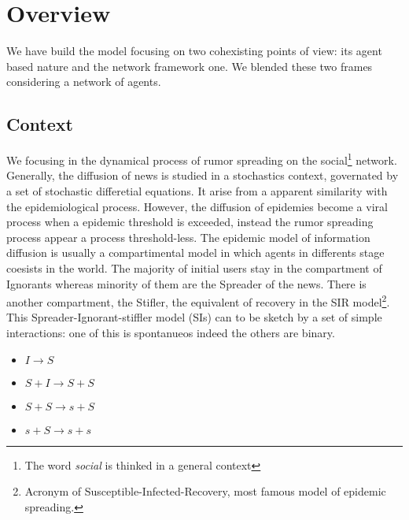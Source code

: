 \documentclass[11pt]{article} %
\begin{document}
\section{Overview}
We have build the model focusing on two cohexisting points of view: its agent based nature and the network framework one. 
We blended these two frames considering a network of agents. 
\subsection{Context}
We focusing in the dynamical process of rumor spreading on the social\footnote{The word \textit{ social} is thinked in a general context} network. Generally, the diffusion of news is studied in a stochastics context, governated by a set of stochastic differetial equations. It arise from a apparent similarity with the epidemiological process. However, the diffusion of epidemies become a viral process when a epidemic threshold is exceeded, instead the rumor spreading process appear a process threshold-less.  The epidemic model of information diffusion is usually a compartimental model in which agents in differents stage coesists in the world.
The majority of initial users stay in the compartment of Ignorants whereas minority of them are the Spreader of the news. There is another compartment, the Stifler, the equivalent of recovery in the SIR model\footnote{Acronym of Susceptible-Infected-Recovery, most famous model of epidemic spreading.}. 
\\ This Spreader-Ignorant-stiffler model (SIs) can to be sketch by a set of simple interactions: one of this is spontanueos indeed the others are binary.
\begin{itemize}
\item$ I \longrightarrow S$
\item $S+I \longrightarrow S + S$

\item $S + S \longrightarrow s + S$

\item $s + S \longrightarrow  s + s$
\end{itemize}
\end{document}
